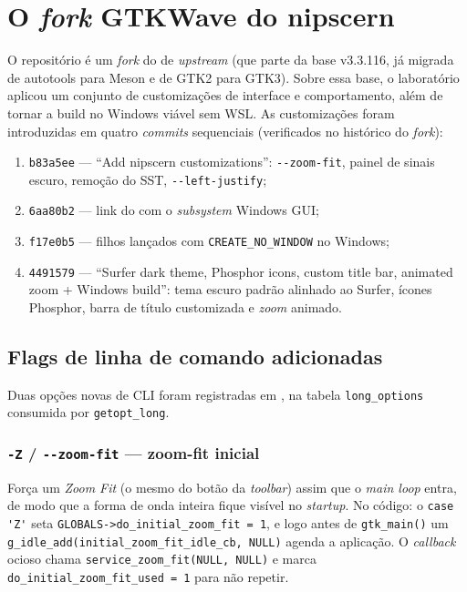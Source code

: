 \section{O \emph{fork} GTKWave do nipscern}
\label{sec:cap10-gtkwave-fork}

O repositório  é um \emph{fork} do  de
\emph{upstream} (que parte da base v3.3.116, já migrada de autotools para Meson e
de GTK2 para GTK3). Sobre essa base, o laboratório aplicou um conjunto de
customizações de interface e comportamento, além de tornar a build no Windows
viável sem WSL. As customizações foram introduzidas em quatro \emph{commits}
sequenciais (verificados no histórico do \emph{fork}):

\begin{enumerate}[label=\arabic*.]
  \item \lstinline|b83a5ee| — \enquote{Add nipscern customizations}: \lstinline|--zoom-fit|,
        painel de sinais escuro, remoção do SST, \lstinline|--left-justify|;
  \item \lstinline|6aa80b2| — link do  com o \emph{subsystem}
        Windows GUI;
  \item \lstinline|f17e0b5| — filhos lançados com \lstinline|CREATE_NO_WINDOW| no
        Windows;
  \item \lstinline|4491579| — \enquote{Surfer dark theme, Phosphor icons, custom
        title bar, animated zoom + Windows build}: tema escuro padrão alinhado ao
        Surfer, ícones Phosphor, barra de título customizada e \emph{zoom} animado.
\end{enumerate}

\subsection{Flags de linha de comando adicionadas}
\label{sec:cap10-gtkwave-flags}

Duas opções novas de CLI foram registradas em , na tabela
\lstinline|long_options| consumida por \lstinline|getopt_long|.

\subsubsection{\lstinline|-Z| / \lstinline|--zoom-fit| — zoom-fit inicial}

Força um \emph{Zoom Fit} (o mesmo do botão da \emph{toolbar}) assim que o
\emph{main loop} entra, de modo que a forma de onda inteira fique visível no
\emph{startup}. No código: o \lstinline|case 'Z'| seta
\lstinline|GLOBALS->do_initial_zoom_fit = 1|, e logo antes de \lstinline|gtk_main()|
um \lstinline|g_idle_add(initial_zoom_fit_idle_cb, NULL)| agenda a aplicação. O
\emph{callback} ocioso chama \lstinline|service_zoom_fit(NULL, NULL)| e marca
\lstinline|do_initial_zoom_fit_used = 1| para não repetir.

